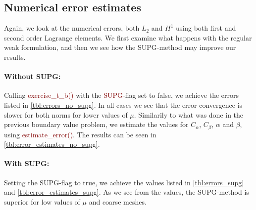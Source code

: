 \documentclass[]{article}
\renewcommand{\texttt}[1]{\textcolor{Maroon}{#1}}
\begin{document}
\subsection*{Numerical error estimates}

Again, we look at the numerical errors, both $L_2$ and $H^1$ using both first
and second order Lagrange elements. We first examine what happens with the
regular weak formulation, and then we see how the SUPG-method may improve our
results. 


\paragraph{Without SUPG:} Calling \texttt{exercise\_t\_b()} with the
\texttt{SUPG}-flag set to false, we achieve the errors listed in
\cref{tbl:errors_no_supg}. In all cases we see that the error convergence is
slower for both norms for lower values of $\mu$.  Similarily to what was done
in the previous boundary value problem, we estimate the values for $C_\alpha$,
$C_\beta$, $\alpha$ and $\beta$, using \texttt{estimate\_error()}. The results
can be seen in \cref{tbl:error_estimates_no_supg}.

\paragraph{With SUPG:} Setting the SUPG-flag to true, we achieve the values
listed in \cref{tbl:errors_supg} and \cref{tbl:error_estimates_supg}. As we see
from the values, the SUPG-method is superior for low values of $\mu$ and
coarse meshes.
\end{document}
